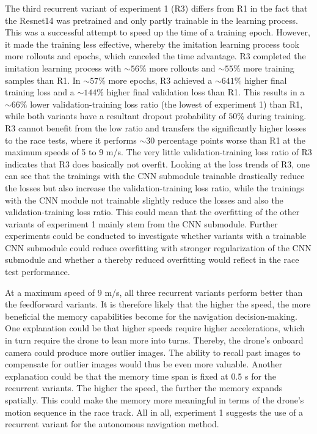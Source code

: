 The third recurrent variant of experiment 1 (R3)
differs from R1 in the fact that 
the Resnet14 was pretrained 
and only partly trainable in the learning process.
This was a successful attempt to speed up the time of a training epoch.
However, it made the training less effective,
whereby the imitation learning process took more rollouts and epochs,
which canceled the time advantage.
R3 completed the imitation learning process with $\sim 56 \%$ more rollouts
and $\sim 55 \%$ more training samples than R1.
In $\sim 57 \%$ more epochs,
R3 achieved a $\sim 641 \%$ higher final training loss
and a $\sim 144 \%$ higher final validation loss than R1.
This results in a $\sim 66 \%$ lower validation-training loss ratio (the lowest of experiment 1) 
than R1, 
while both variants have a resultant dropout probability of $50 \%$ during training.
R3 cannot benefit from the low ratio and transfers the significantly higher losses to the race tests,
where it performs $\sim 30$ percentage points worse than R1 at the maximum speeds of 5 to 9 m/s.
The very little validation-training loss ratio of R3 
indicates that R3 does basically not overfit.
Looking at the loss trends of R3,
one can see that the trainings with the CNN submodule trainable
drastically reduce the losses but also increase the validation-training loss ratio,
while the trainings with the CNN module not trainable
slightly reduce the losses and also the validation-training loss ratio.
This could mean that the overfitting of the other variants of experiment 1
mainly stem from the CNN submodule.
Further experiments could be conducted 
to investigate whether variants
with a trainable CNN submodule
could reduce overfitting 
with stronger regularization of the CNN submodule 
and whether a thereby reduced overfitting would reflect in the race test performance.

At a maximum speed of 9 m/s, all three recurrent variants perform better than the feedforward variants.
It is therefore likely that the higher the speed, the more beneficial the memory capabilities become for
the navigation decision-making.
One explanation could be that higher speeds require higher accelerations,
which in turn require the drone to lean more into turns.
Thereby, the drone's onboard camera could produce more outlier images.
The ability to recall past images to compensate for outlier images would thus be even more valuable.
Another explanation could be that the memory time span is fixed at 0.5 s for the recurrent variants.
The higher the speed, the further the memory expands spatially.
This could make the memory more meaningful in terms of the drone's motion sequence in the race track.
All in all, experiment 1 suggests the use of a recurrent variant for the autonomous navigation method.


